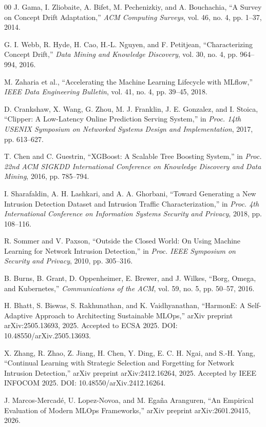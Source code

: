 \documentclass[runningheads]{llncs}
\begin{document}
\begin{thebibliography}{00}
J. Gama, I. Zliobaite, A. Bifet, M. Pechenizkiy, and A. Bouchachia, ``A Survey on Concept Drift Adaptation,'' \textit{ACM Computing Surveys}, vol. 46, no. 4, pp. 1--37, 2014.

G. I. Webb, R. Hyde, H. Cao, H.-L. Nguyen, and F. Petitjean,
``Characterizing Concept Drift,''
\textit{Data Mining and Knowledge Discovery}, vol. 30, no. 4,
pp. 964--994, 2016.

M. Zaharia et al., ``Accelerating the Machine Learning Lifecycle with MLflow,'' \textit{IEEE Data Engineering Bulletin}, vol. 41, no. 4, pp. 39--45, 2018.

D. Crankshaw, X. Wang, G. Zhou, M. J. Franklin, J. E. Gonzalez, and I. Stoica,
``Clipper: A Low-Latency Online Prediction Serving System,''
in \textit{Proc. 14th USENIX Symposium on Networked Systems Design and Implementation},
2017, pp. 613--627.

T. Chen and C. Guestrin, ``XGBoost: A Scalable Tree Boosting System,'' in \textit{Proc. 22nd ACM SIGKDD International Conference on Knowledge Discovery and Data Mining}, 2016, pp. 785--794.

I. Sharafaldin, A. H. Lashkari, and A. A. Ghorbani, ``Toward Generating a New Intrusion Detection Dataset and Intrusion Traffic Characterization,'' in \textit{Proc. 4th International Conference on Information Systems Security and Privacy}, 2018, pp. 108--116.

R. Sommer and V. Paxson,
``Outside the Closed World: On Using Machine Learning for Network Intrusion Detection,''
in \textit{Proc. IEEE Symposium on Security and Privacy}, 2010, pp. 305--316.

B. Burns, B. Grant, D. Oppenheimer, E. Brewer, and J. Wilkes, ``Borg, Omega, and Kubernetes,'' \textit{Communications of the ACM}, vol. 59, no. 5, pp. 50--57, 2016.

H. Bhatt, S. Biswas, S. Rakhunathan, and K. Vaidhyanathan,
``HarmonE: A Self-Adaptive Approach to Architecting Sustainable MLOps,''
arXiv preprint arXiv:2505.13693, 2025. Accepted to ECSA 2025.
DOI: 10.48550/arXiv.2505.13693.

X. Zhang, R. Zhao, Z. Jiang, H. Chen, Y. Ding, E. C. H. Ngai, and S.-H. Yang,
``Continual Learning with Strategic Selection and Forgetting for Network Intrusion Detection,''
arXiv preprint arXiv:2412.16264, 2025. Accepted by IEEE INFOCOM 2025.
DOI: 10.48550/arXiv.2412.16264.

J. Marcos-Mercad\'e, U. Lopez-Novoa, and M. Ega\~na Aranguren,
``An Empirical Evaluation of Modern MLOps Frameworks,''
arXiv preprint arXiv:2601.20415, 2026.

\end{thebibliography}
\end{document}

